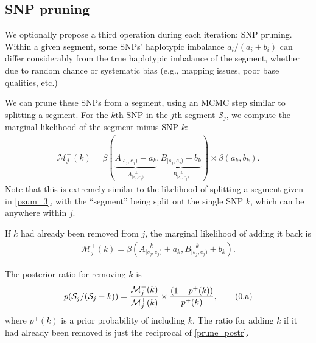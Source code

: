 \documentclass[10pt,letter]{article}
\numberwithin{equation}{section}
\newcommand{\rt}{\right}
\newcommand{\lt}{\left}
\newcommand{\btag}[1]{\addtocounter{equation}{1}\label{#1}\tag{\arabic{section}.\alph{equation}}}
\begin{document}
\subsection{SNP pruning}

We optionally propose a third operation during each iteration: SNP pruning. Within a given segment, some SNPs' haplotypic imbalance $a_i/(a_i+b_i)$ can differ considerably from the true haplotypic imbalance of the segment, whether due to random chance or systematic bias (e.g., mapping issues, poor base qualities, etc.)

We can prune these SNPs from a segment, using an MCMC step similar to splitting a segment. For the $k$th SNP in the $j$th segment $\mathcal{S}_j$, we compute the marginal likelihood of the segment minus SNP $k$:
\begin{align*}
\mathcal{M}^{-}_j(k) = \beta(\underbrace{A_{[s_j,e_j)} - a_k}_{A^{-k}_{[s_j,e_j)}}, \underbrace{B_{[s_j,e_j)} - b_k}_{B^{-k}_{[s_j,e_j)}})\times\beta(a_k, b_k).
\end{align*}
Note that this is extremely similar to the likelihood of splitting a segment given in \eqref{psum_3}, with the ``segment'' being split out the single SNP $k$, which can be anywhere within $j$.

If $k$ had already been removed from $j$, the marginal likelihood of adding it back is
\begin{align*}
\mathcal{M}^{+}_j(k) = \beta(A^{-k}_{[s_j,e_j)} + a_k, B^{-k}_{[s_j,e_j)} + b_k).
\end{align*}

The posterior ratio for removing $k$ is
\begin{align*}
p(\mathcal{S}_j/(\mathcal{S}_j-k))=\frac{\mathcal{M}^{-}_j(k)}{\mathcal{M}^{+}_j(k)}\times\frac{(1 - p^{+}(k))}{p^{+}(k)},\btag{prune_postr}
\end{align*}
where $p^{+}(k)$ is a prior probability of including $k$. %
The ratio for adding $k$ if it had already been removed is just the reciprocal of \eqref{prune_postr}.
\end{document}
